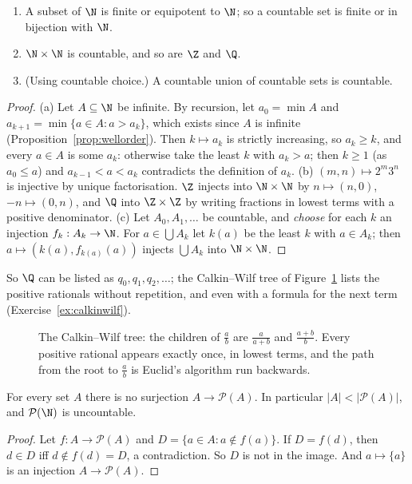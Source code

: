 \begin{proposition}\label{prop:countable}
\begin{enumerate}[label=(\alph*)]
\item A subset of $\N$ is finite or equipotent to $\N$; so a countable set is finite or in bijection with $\N$.
\item $\N\times\N$ is countable, and so are $\Z$ and $\Q$.
\item (Using countable choice.) A countable union of countable sets is countable.
\end{enumerate}
\end{proposition}
\begin{proof}
(a) Let $A\subseteq\N$ be infinite. By recursion, let $a_0=\min A$ and $a_{k+1}=\min\{a\in A:a>a_k\}$, which exists since $A$ is infinite
(Proposition~\ref{prop:wellorder}). Then $k\mapsto a_k$ is strictly increasing, so $a_k\ge k$, and every $a\in A$ is some $a_k$: otherwise take the least
$k$ with $a_k>a$; then $k\ge1$ (as $a_0\le a$) and $a_{k-1}<a<a_k$ contradicts the definition of $a_k$. (b) $(m,n)\mapsto2^m3^n$ is injective by
unique factorisation. $\Z$ injects into $\N\times\N$ by $n\mapsto(n,0)$, $-n\mapsto(0,n)$, and $\Q$ into $\Z\times\Z$ by writing fractions in lowest terms with a
positive denominator. (c) Let $A_0,A_1,\ldots$ be countable, and \emph{choose} for each $k$ an injection $f_k:A_k\to\N$. For $a\in\bigcup A_k$ let $k(a)$ be the
least $k$ with $a\in A_k$; then $a\mapsto(k(a),f_{k(a)}(a))$ injects $\bigcup A_k$ into $\N\times\N$.
\end{proof}

So $\Q$ can be listed as $q_0,q_1,q_2,\ldots$; the Calkin--Wilf tree of Figure~\ref{fig:calkinwilf} lists the positive rationals
without repetition, and even with a formula for the next term (Exercise~\ref{ex:calkinwilf}).

\begin{figure}[ht]
\centering
{}
\caption{The Calkin--Wilf tree: the children of $\frac ab$ are $\frac a{a+b}$ and $\frac{a+b}b$. Every positive rational appears exactly once, in lowest
terms, and the path from the root to $\frac ab$ is Euclid's algorithm run backwards.}
\label{fig:calkinwilf}
\end{figure}

\begin{theorem}[Cantor, 1891]\label{thm:cantor}
For every set $A$ there is no surjection $A\to\mathcal P(A)$. In particular $|A|<|\mathcal P(A)|$, and $\mathcal P(\N)$ is uncountable.
\end{theorem}
\begin{proof}
Let $f:A\to\mathcal P(A)$ and $D=\{a\in A:a\notin f(a)\}$. If $D=f(d)$, then $d\in D$ iff $d\notin f(d)=D$, a contradiction. So $D$ is not in the image.
And $a\mapsto\{a\}$ is an injection $A\to\mathcal P(A)$.
\end{proof}

